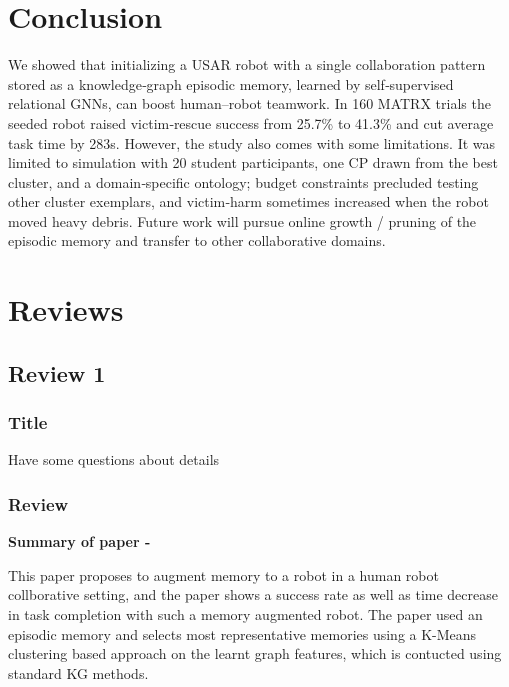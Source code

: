 \documentclass[letterpaper]{article} %
\begin{document}
\section{Conclusion}
\label{sec:conclusion}


We showed that initializing a USAR robot with a single collaboration pattern stored as a knowledge‑graph episodic memory, learned by self‑supervised relational GNNs, can boost human–robot teamwork. In 160 MATRX trials the seeded robot raised victim‑rescue success from 25.7\% to 41.3\% and cut average task time by 283s. However, the study also comes with some limitations. It was limited to simulation with 20 student participants, one CP drawn from the best cluster, and a domain‑specific ontology; budget constraints precluded testing other cluster exemplars, and victim‑harm sometimes increased when the robot moved heavy debris. Future work will pursue online growth / pruning of the episodic memory and transfer to other collaborative domains.






\clearpage

\section{Reviews}

\subsection{Review 1}

\subsubsection*{Title}
Have some questions about details

\subsubsection*{Review}
\textbf{Summary of paper -}

This paper proposes to augment memory to a robot in a human robot collborative setting, and the paper shows a success rate as well as time decrease in task completion with such a memory augmented robot. The paper used an episodic memory and selects most representative memories using a K-Means clustering based approach on the learnt graph features, which is contucted using standard KG methods.
\end{document}
